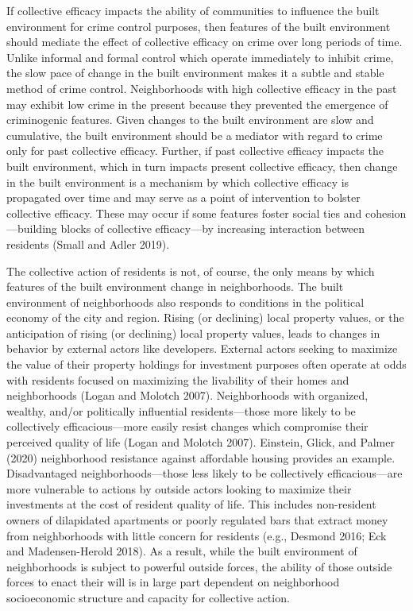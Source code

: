 \documentclass [11pt, proquest] {uwthesis}[2015/03/03]
\begin{document}
If collective efficacy impacts the ability of communities to influence the built environment for crime control purposes, then features of the built environment should mediate the effect of collective efficacy on crime over long periods of time. Unlike informal and formal control which operate immediately to inhibit crime, the slow pace of change in the built environment makes it a subtle and stable method of crime control. Neighborhoods with high collective efficacy in the past may exhibit low crime in the present because they prevented the emergence of criminogenic features. Given changes to the built environment are slow and cumulative, the built environment should be a mediator with regard to crime only for past collective efficacy. Further, if past collective efficacy impacts the built environment, which in turn impacts present collective efficacy, then change in the built environment is a mechanism by which collective efficacy is propagated over time and may serve as a point of intervention to bolster collective efficacy. These may occur if some features foster social ties and cohesion---building blocks of collective efficacy---by increasing interaction between residents (Small and Adler 2019).

The collective action of residents is not, of course, the only means by which features of the built environment change in neighborhoods. The built environment of neighborhoods also responds to conditions in the political economy of the city and region. Rising (or declining) local property values, or the anticipation of rising (or declining) local property values, leads to changes in behavior by external actors like developers. External actors seeking to maximize the value of their property holdings for investment purposes often operate at odds with residents focused on maximizing the livability of their homes and neighborhoods (Logan and Molotch 2007). Neighborhoods with organized, wealthy, and/or politically influential residents---those more likely to be collectively efficacious---more easily resist changes which compromise their perceived quality of life (Logan and Molotch 2007). Einstein, Glick, and Palmer (2020) neighborhood resistance against affordable housing provides an example. Disadvantaged neighborhoods---those less likely to be collectively efficacious---are more vulnerable to actions by outside actors looking to maximize their investments at the cost of resident quality of life. This includes non-resident owners of dilapidated apartments or poorly regulated bars that extract money from neighborhoods with little concern for residents (e.g., Desmond 2016; Eck and Madensen-Herold 2018). As a result, while the built environment of neighborhoods is subject to powerful outside forces, the ability of those outside forces to enact their will is in large part dependent on neighborhood socioeconomic structure and capacity for collective action.
\end{document}
